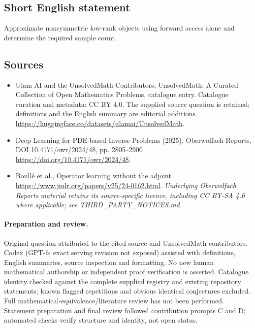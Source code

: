 \documentclass[11pt]{article}
\begin{document}
\subsection{Short English statement}
Approximate nonsymmetric low-rank objects using forward access alone and determine the required sample count.
\subsection{Sources}
\begin{itemize}
\item[\hypertarget{source:statement:1}{S1}] Ulam AI and the UnsolvedMath Contributors, UnsolvedMath: A Curated Collection of Open Mathematics Problems, catalogue entry. Catalogue curation and metadata: CC BY 4.0. The supplied source question is retained; definitions and the English summary are editorial additions.
\url{https://huggingface.co/datasets/ulamai/UnsolvedMath}.
\item[\hypertarget{source:statement:2}{S2}] Deep Learning for PDE-based Inverse Problems (2025), Oberwolfach Reports, DOI 10.4171/owr/2024/48, pp. 2805--2900
\url{https://doi.org/10.4171/owr/2024/48}.
\item[\hypertarget{source:statement:3}{S3}] Boullé et al., Operator learning without the adjoint
\url{https://www.jmlr.org/papers/v25/24-0162.html}.
\textit{Underlying Oberwolfach Reports material retains its source-specific licence, including CC BY-SA 4.0 where applicable; see THIRD\_PARTY\_NOTICES.md.}
\end{itemize}
\paragraph{Preparation and review.}
Original question attributed to the cited source and UnsolvedMath contributors. Codex (GPT-6; exact serving revision not exposed) assisted with definitions, English summaries, source inspection and formatting. No new human mathematical authorship or independent proof verification is asserted. Catalogue identity checked against the complete supplied registry and existing repository statements; known flagged repetitions and obvious identical conjectures excluded. Full mathematical-equivalence/literature review has not been performed. Statement preparation and final review followed contribution prompts C and D; automated checks verify structure and identity, not open status.
\label{end:statement}
\end{document}
